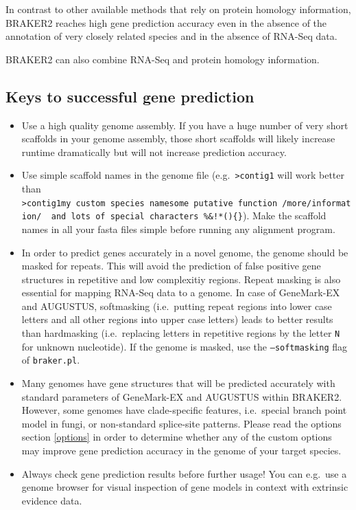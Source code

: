 \documentclass[]{article}
\begin{document}
In contrast to other available methods that rely on protein homology
information, BRAKER2 reaches high gene prediction accuracy even in the
absence of the annotation of very closely related species and in the
absence of RNA-Seq data.

BRAKER2 can also combine RNA-Seq and protein homology information.

\subsection{Keys to successful gene prediction}\label{keys-to-successful-gene-prediction}

\begin{itemize}
\item
  Use a high quality genome assembly. If you have a huge number of very
  short scaffolds in your genome assembly, those short scaffolds will
  likely increase runtime dramatically but will not increase prediction
  accuracy.
\item
  Use simple scaffold names in the genome file
  (e.g.~\texttt{\textgreater{}contig1} will work better than
  \texttt{\textgreater{}contig1\textbar{}my\ custom\ species\ name\textbar{}some\ putative\ function\textbar{}\ /more/information/\ \textbar{}\ and\ lots\ of\ special\ characters\ \%\&!*()\{\}}).
  Make the scaffold names in all your fasta files simple before running
  any alignment program.
\item
  In order to predict genes accurately in a novel genome, the genome
  should be masked for repeats. This will avoid the prediction of false
  positive gene structures in repetitive and low complexitiy regions.
  Repeat masking is also essential for mapping RNA-Seq data to a genome.
  In case of GeneMark-EX and AUGUSTUS, softmasking (i.e.~putting repeat
  regions into lower case letters and all other regions into upper case
  letters) leads to better results than hardmasking (i.e.~replacing
  letters in repetitive regions by the letter \texttt{N} for unknown
  nucleotide). If the genome is masked, use the \texttt{–softmasking}
  flag of \texttt{braker.pl}.
\item
  Many genomes have gene structures that will be predicted accurately
  with standard parameters of GeneMark-EX and AUGUSTUS within BRAKER2.
  However, some genomes have clade-specific features, i.e.~special
  branch point model in fungi, or non-standard splice-site patterns.
  Please read the options section \ref{options} in order to determine
  whether any of the custom options may improve gene prediction accuracy
  in the genome of your target species.
\item
  Always check gene prediction results before further usage! You can
  e.g.~use a genome browser for visual inspection of gene models in
  context with extrinsic evidence data.
\end{itemize}
\end{document}
